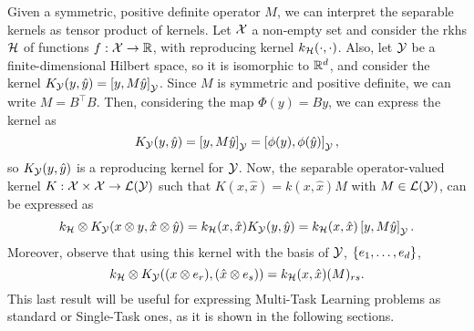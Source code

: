 Given a symmetric, positive definite operator $M$, we can interpret the separable kernels as tensor product of kernels.
Let $\mathcal{X}$ a non-empty set and consider the \acrshort{rkhs} $\mathcal{H}$ of functions $f: \mathcal{X} \to \mathbb{R}$, with reproducing kernel $k_{\mathcal{H}}(\cdot, \cdot)$.
Also, let $\mathcal{Y}$ be a finite-dimensional Hilbert space, so it is isomorphic to $\mathbb{R}^d$, and consider the kernel $K_{\mathcal{Y}}(y, \hat{y}) = \left[ y, M \hat{y} \right]_\mathcal{Y}$. Since $M$ is symmetric and positive definite, we can write $M = B^\intercal B$. Then, considering the map $\Phi(y) = B y$, we can express the kernel as 
$$ K_{\mathcal{Y}}(y, \hat{y}) = \left[ y, M \hat{y} \right]_\mathcal{Y} = \left[ \phi(y), \phi(\hat{y}) \right]_\mathcal{Y},$$ 
so $K_{\mathcal{Y}}(y, \hat{y})$ is a reproducing kernel for $\mathcal{Y}$.
Now, the separable operator-valued kernel 
    $K: \mathcal{X} \times \mathcal{X} \to \mathcal{L}(\mathcal{Y})$
    such that
    $K(x, \hat{x}) = k(x, \hat{x})M$
    with $M \in \mathcal{L}(\mathcal{Y})$,
can be expressed as 
$$ k_{\mathcal{H}} \otimes K_{\mathcal{Y}}(x \otimes y, \hat{x} \otimes \hat{y}) = k_{\mathcal{H}}(x, \hat{x}) K_{\mathcal{Y}}(y, \hat{y}) = k_{\mathcal{H}}(x, \hat{x}) \left[ y, M \hat{y} \right]_\mathcal{Y} .$$
Moreover, observe that using this kernel with the basis of $\mathcal{Y}$,  $\left\{e_1, \ldots, e_d\right\}$, 
    $$ k_{\mathcal{H}} \otimes K_{\mathcal{Y}}((x \otimes e_r) , (\hat{x} \otimes e_s)) = k_{\mathcal{H}}(x, \hat{x}) (M)_{rs}.$$
This last result will be useful for expressing Multi-Task Learning problems as standard or Single-Task ones, as it is shown in the following sections.



